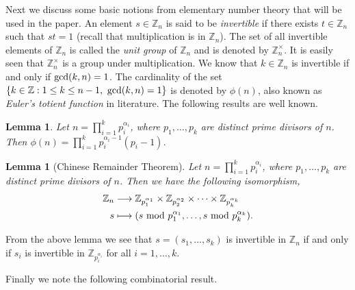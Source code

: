\documentclass[12pt]{article}
\newcommand{\mb}{\mathbb}
\newtheorem{lemma}[defn]{{\bf Lemma}}
\begin{document}
Next we discuss some basic notions from elementary number theory that will
be used in the paper. An element $s\in \mb{Z}_n$ is said to be {\em
invertible} if there exists $t\in \mb{Z}_n$ such that $st=1$ (recall that
multiplication is in $\mb{Z}_n$). The set of
all invertible elements of $\mb{Z}_n$ is called the {\em unit group} of
$\mb{Z}_n$ and is denoted by $\mb{Z}_n^{\times}$. It is easily seen that
$\mb{Z}_n^{\times}$ is a group under multiplication. We know that $k\in
\mb{Z}_n$ is invertible if and only if ${\rm gcd}(k,n)=1$. The cardinality
of the set $\{k\in \mb{Z}: 1\leq k\leq n-1,\ {\rm gcd}(k,n)=1\}$ is denoted by
$\phi(n)$, also known as {\em Euler's totient function} in literature. The
following results are well known.
\begin{lemma}\label{lem:totient}
Let $n=\prod_{i=1}^k p_i^{\alpha_i}$, where $p_1,\ldots,p_k$ are distinct
prime divisors of $n$. Then $\phi(n)=\prod_{i=1}^k
p_i^{\alpha_i-1}(p_i-1)$.
\end{lemma}
\begin{lemma}[Chinese Remainder Theorem]\label{lem:crt}
Let $n=\prod_{i=1}^k p_i^{\alpha_i}$, where $p_1,\ldots,p_k$ are distinct
prime divisors of $n$. Then we have the following isomorphism,
\begin{align}\label{eq:chinese}
\mathbb{Z}_n & \longrightarrow \mathbb{Z}_{p_1^{\alpha_1}}\times
\mathbb{Z}_{p_2^{\alpha_2}}\times\cdots \times \mathbb{Z}_{p_k^{\alpha_k}}
\nonumber \\
s & \longmapsto (s \text{\rm\  mod } p_1^{\alpha_1},\ldots,s \text{\rm\ mod }
p_k^{\alpha_k}).
\end{align}
\end{lemma}
From the above lemma we see that $s=(s_1,\ldots,s_k)$ is invertible in
$\mb{Z}_n$ if and only if $s_i$ is invertible in $\mb{Z}_{p_i^{\alpha_i}}$
for all $i=1,\ldots,k$. 

Finally we note the following combinatorial result.
\end{document}
